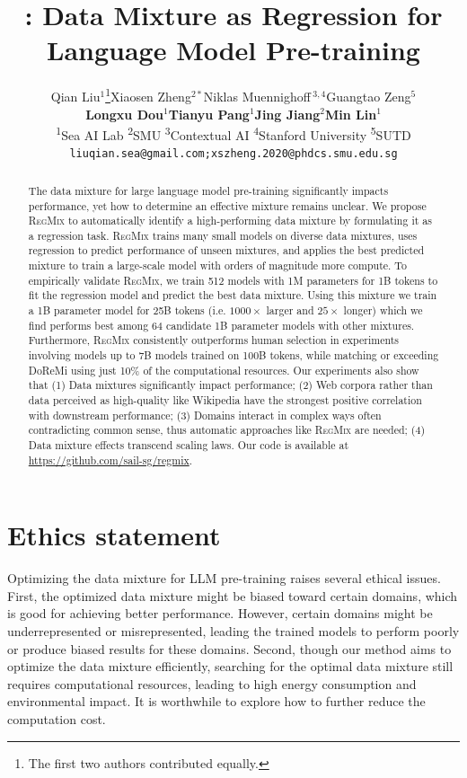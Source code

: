 \documentclass{article} %
\title{\ourmethod: Data Mixture as Regression for\\Language Model Pre-training}
\author{%
Qian Liu$^{1}$\!\thanks{The first two authors contributed equally.}\;\quad Xiaosen Zheng$^{2*}$\quad Niklas Muennighoff$\,^{3,4}$\quad Guangtao Zeng$^5$\\ \textbf{Longxu Dou}$^1$\quad \textbf{Tianyu Pang}$^1$\quad \textbf{Jing Jiang}$^2$\quad \textbf{Min Lin}$^1$ \\
    \textsuperscript{1}Sea AI Lab  \quad \textsuperscript{2}SMU \quad \textsuperscript{3}Contextual AI \quad \textsuperscript{4}Stanford University \quad \textsuperscript{5}SUTD \\
    \texttt{\small liuqian.sea@gmail.com;\;xszheng.2020@phdcs.smu.edu.sg}
}
\theoremstyle{definition}
\theoremstyle{remark}
\newcommand{\ourmethod}{\textsc{RegMix}\xspace}
\begin{document}
\maketitle

\begin{abstract}
The data mixture for large language model pre-training significantly impacts performance, yet how to determine an effective mixture remains unclear.
We propose \ourmethod to automatically identify a high-performing data mixture by formulating it as a regression task. \ourmethod trains many small models on diverse data mixtures, uses regression to predict performance of unseen mixtures, and applies the best predicted mixture to train a large-scale model with orders of magnitude more compute.
To empirically validate \ourmethod, we train 512 models with 1M parameters for 1B tokens to fit the regression model and predict the best data mixture. Using this mixture we train a 1B parameter model for 25B tokens (i.e. $1000 \times$ larger and $25 \times$ longer) which we find performs best among 64 candidate 1B parameter models with other mixtures.
Furthermore, \ourmethod consistently outperforms human selection in experiments involving models up to 7B models trained on 100B tokens, while matching or exceeding DoReMi using just 10\% of the computational resources.
Our experiments also show that (1) Data mixtures significantly impact performance; (2) Web corpora rather than data perceived as high-quality like Wikipedia have the strongest positive correlation with downstream performance; (3) Domains interact in complex ways often contradicting common sense, thus automatic approaches like \ourmethod are needed; (4) Data mixture effects transcend scaling laws. Our code is available at \url{https://github.com/sail-sg/regmix}.

\end{abstract}









\clearpage
\section*{Ethics statement} 
Optimizing the data mixture for LLM pre-training raises several ethical issues. 
First, the optimized data mixture might be biased toward certain domains, which is good for achieving better performance. However, certain domains might be underrepresented or misrepresented, leading the trained models to perform poorly or produce biased results for these domains.
Second, though our method aims to optimize the data mixture efficiently, searching for the optimal data mixture still requires computational resources, leading to high energy consumption and environmental impact.
It is worthwhile to explore how to further reduce the computation cost. 




\clearpage
\appendix





\end{document}

